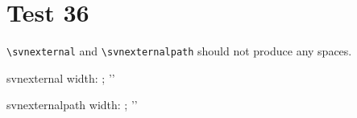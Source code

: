 \documentclass[12pt]{report}
\begin{document}
\chapter{Test 36}
\verb+\svnexternal+ and \verb+\svnexternalpath+ should not produce any spaces.

\newlength{\mywidth}
\newsavebox{\mybox}
\savebox{\mybox}{\svnexternal{}}
\settowidth{\mywidth}{\usebox{\mybox}}
\noindent
svnexternal width: \the\mywidth; '\usebox{\mybox}'\\

\savebox{\mybox}{\svnexternal{}}
\settowidth{\mywidth}{\usebox{\mybox}}
\noindent
svnexternalpath width: \the\mywidth; '\usebox{\mybox}'\\
\end{document}
